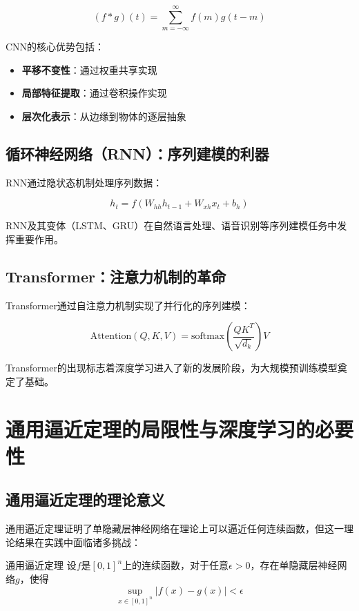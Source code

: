 \begin{equation}
(f * g)(t) = \sum_{m=-\infty}^{\infty} f(m) g(t-m)
\end{equation}

CNN的核心优势包括：
\begin{itemize}
\item {\bf 平移不变性}：通过权重共享实现
\item {\bf 局部特征提取}：通过卷积操作实现
\item {\bf 层次化表示}：从边缘到物体的逐层抽象
\end{itemize}

\subsection{循环神经网络（RNN）：序列建模的利器}

RNN通过隐状态机制处理序列数据：

\begin{equation}
h_t = f(W_{hh} h_{t-1} + W_{xh} x_t + b_h)
\end{equation}

RNN及其变体（LSTM、GRU）在自然语言处理、语音识别等序列建模任务中发挥重要作用。

\subsection{Transformer：注意力机制的革命}

Transformer通过自注意力机制实现了并行化的序列建模：

\begin{equation}
\text{Attention}(Q,K,V) = \text{softmax}\left(\frac{QK^T}{\sqrt{d_k}}\right)V
\end{equation}

Transformer的出现标志着深度学习进入了新的发展阶段，为大规模预训练模型奠定了基础。

\section{通用逼近定理的局限性与深度学习的必要性}

\subsection{通用逼近定理的理论意义}

通用逼近定理证明了单隐藏层神经网络在理论上可以逼近任何连续函数，但这一理论结果在实践中面临诸多挑战：

\begin{theorem}[]{通用逼近定理}
设$f$是$[0,1]^n$上的连续函数，对于任意$\epsilon > 0$，存在单隐藏层神经网络$g$，使得
$$\sup_{x \in [0,1]^n} |f(x) - g(x)| < \epsilon$$
\end{theorem}

